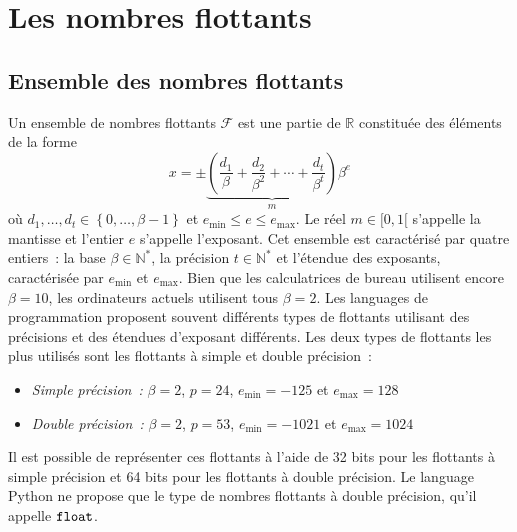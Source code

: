 \documentclass{article}
\newcommand{\Ns}{\mathbb{N}^*}
\newcommand{\R}{\mathbb{R}}
\newcommand{\p}[1]{\left(#1\right)}
\newcommand{\ens}[1]{\left\{#1\right\}}
\newcommand{\python}{Python\xspace}
\begin{document}
	
\section{Les nombres flottants}
\subsection{Ensemble des nombres flottants}

Un ensemble de nombres flottants $\mathcal{F}$ est une partie de $\R$
constituée des éléments de la forme
\[x = \pm 
  \underbrace{
	\p{\frac{d_1}{\beta}+\frac{d_2}{\beta^2}+\cdots+\frac{d_t}{\beta^t}}}_{m}
  \beta^e\]
où $d_1,\ldots,d_t\in\ens{0,\ldots,\beta-1}$ et
$e_\text{min}\leq e\leq e_\text{max}$. Le réel $m\in[0,1[$ s'appelle la
mantisse et l'entier $e$ s'appelle l'exposant.
Cet ensemble est caractérisé par quatre entiers~: la base $\beta\in\Ns$, la
précision $t\in\Ns$ et l'étendue des exposants, caractérisée par
$e_\text{min}$ et $e_\text{max}$. Bien que les calculatrices de bureau
utilisent encore $\beta=10$, les ordinateurs actuels utilisent tous
$\beta=2$. Les languages de programmation proposent souvent différents types
de flottants utilisant des précisions et des étendues d'exposant différents.
Les deux types de flottants les plus utilisés sont les flottants à simple
et double précision~:
\begin{itemize}
	\item \emph{Simple précision~:} $\beta=2$, $p=24$, $e_\text{min}=-125$ et
	  $e_\text{max}=128$
	\item \emph{Double précision~:} $\beta=2$, $p=53$, $e_\text{min}=-1021$ et
	  $e_\text{max}=1024$
\end{itemize}
Il est possible de représenter ces flottants à l'aide de 32 bits pour les
flottants à simple précision et 64 bits pour les flottants à double précision.
Le language \python ne propose que le type de nombres flottants à double
précision, qu'il appelle $\verb+float+$.\\
\end{document}
